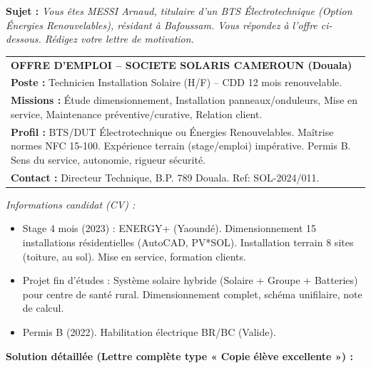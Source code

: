 \documentclass[11pt]{article}
\begin{document}
\begin{exoresolu}
\textbf{Sujet :} \textit{Vous êtes MESSI Arnaud, titulaire d'un BTS Électrotechnique (Option Énergies Renouvelables), résidant à Bafoussam. Vous répondez à l'offre ci-dessous. Rédigez votre lettre de motivation.}

\begin{center}
\begin{tabularx}{\linewidth}{|X|}\hline
\rowcolor{popblueL} \textbf{OFFRE D'EMPLOI -- SOCIETE SOLARIS CAMEROUN (Douala)} \\
\textbf{Poste :} Technicien Installation Solaire (H/F) -- CDD 12 mois renouvelable. \\
\textbf{Missions :} Étude dimensionnement, Installation panneaux/onduleurs, Mise en service, Maintenance préventive/curative, Relation client. \\
\textbf{Profil :} BTS/DUT Électrotechnique ou Énergies Renouvelables. Maîtrise normes NFC 15-100. Expérience terrain (stage/emploi) impérative. Permis B. Sens du service, autonomie, rigueur sécurité. \\
\textbf{Contact :} Directeur Technique, B.P. 789 Douala. Ref: SOL-2024/011. \\ \hline
\end{tabularx}
\end{center}

\textit{Informations candidat (CV) :}
\begin{itemize}
\item Stage 4 mois (2023) : ENERGY+ (Yaoundé). Dimensionnement 15 installations résidentielles (AutoCAD, PV*SOL). Installation terrain 8 sites (toiture, au sol). Mise en service, formation clients.
\item Projet fin d'études : Système solaire hybride (Solaire + Groupe + Batteries) pour centre de santé rural. Dimensionnement complet, schéma unifilaire, note de calcul.
\item Permis B (2022). Habilitation électrique BR/BC (Valide).
\end{itemize}

\tcblower
\textbf{Solution détaillée (Lettre complète type « Copie élève excellente ») :}


\end{exoresolu}
\end{document}
